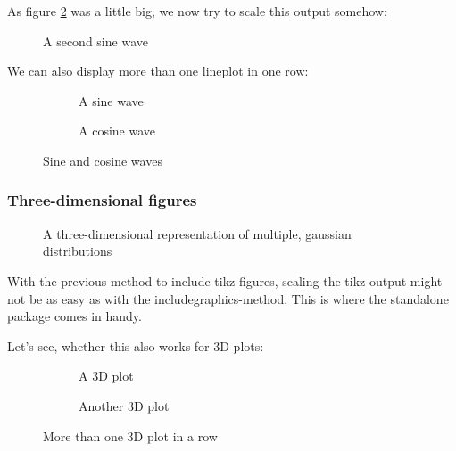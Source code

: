 As figure \ref{fig:sin} was a little big, we now try to scale this output somehow:

\begin{figure}[H]
	\centering
	
	\caption{A second sine wave}
	\label{fig:sin2}
\end{figure}

We can also display more than one lineplot in one row:

\begin{figure}[H]
	\centering
	\begin{subfigure}{0.49\textwidth}
		
		\caption{A sine wave}
	\end{subfigure}
	\begin{subfigure}{0.49\textwidth}
		
		\caption{A cosine wave}
	\end{subfigure}
	\caption{Sine and cosine waves}
	\label{fig:sin}
\end{figure}

\subsubsection{Three-dimensional figures}
\begin{figure}[H]
	\centering
	
	\caption{A three-dimensional representation of multiple, gaussian distributions}
	\label{fig:gaussian}
\end{figure}

With the previous method to include tikz-figures, scaling the tikz output might not be as easy as with the includegraphics-method. This is where the standalone package comes in handy.

Let's see, whether this also works for 3D-plots:

\begin{figure}[H]
	\centering
	\begin{subfigure}{0.49\textwidth}
		
		\caption{A 3D plot}
	\end{subfigure}
	\begin{subfigure}{0.49\textwidth}
		
		\caption{Another 3D plot}
	\end{subfigure}
	\caption{More than one 3D plot in a row}
	\label{fig:gaussian3}
\end{figure}

